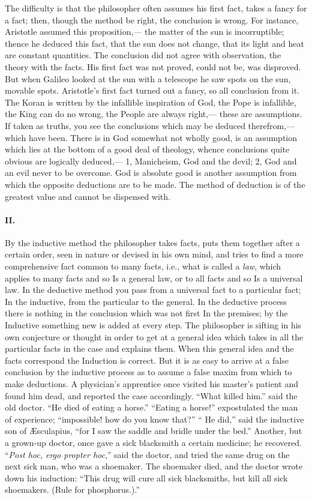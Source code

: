 \documentclass[12pt]{article}
\begin{document}
The difficulty is that the philosopher often assumes his first fact, takes a fancy for a fact; then, though the method be right, the conclusion is wrong. For instance, Aristotle assumed this proposition,--- the matter of the sun is incorruptible; thence he deduced this fact, that the sun does not change, that its light and heat are constant quantities. The conclusion did not agree with observation, the theory with the facts. His first fact was not proved, could not be, was disproved. But when Galileo looked at the sun with a telescope he saw spots on the sun, movable spots. Aristotle's first fact turned out a fancy, so all conclusion from it. The Koran is written by the infallible inspiration of God, the Pope is infallible, the King can do no wrong, the People are always right,--- these are assumptions. If taken as truths, you see the conclusions which may be deduced therefrom,--- which have been. There is in God somewhat not wholly good, is an assumption which lies at the bottom of a good deal of theology, whence conclusions quite obvious are logically deduced,--- 1, Manicheism, God and the devil; 2, God and an evil never to be overcome. God is absolute good is another assumption from which the opposite deductions are to be made. The method of deduction is of the greatest value and cannot be dispensed with. 

\paragraph{II.} By the inductive method the philosopher takes facts, puts them together after a certain order, seen in nature or devised in his own mind, and tries to find a more comprehensive fact common to many facts, i.e., what is called a \emph{law}, which applies to many facts and so Is a general law, or to all facts and so Is a universal law. In the deductive method you pass from a universal fact to a particular fact; In the inductive, from the particular to the general. In the deductive process there is nothing in the conclusion which was not first In the premises; by the Inductive something new is added at every step. The philosopher is sifting in his own conjecture or thought in order to get at a general idea which takes in all the particular facts in the case and explains them. When this general idea and the facts correspond the Induction is correct. But it is as easy to arrive at a false conclusion by the inductive process as to assume a false maxim from which to make deductions. A physician's apprentice once visited his master's patient and found him dead, and reported the case accordingly. ``What killed him.'' said the old doctor. ``He died of eating a horse.'' ``Eating a horse!'' expostulated the man of experience; ``impossible! how do you know that?'' `` He did,'' said the inductive son of {\AE}sculapius, ``for I saw the saddle and bridle under the bed.'' Another, but a grown-up doctor, once gave a sick blacksmith a certain medicine; he recovered. ``\emph{Post hoc, ergo propter hoc},'' said the doctor, and tried the same drug on the next sick man, who was a shoemaker. The shoemaker died, and the doctor wrote down his induction: ``This drug will cure all sick blacksmiths, but kill all sick shoemakers. (Rule for phosphorus.).'' 
\end{document}
